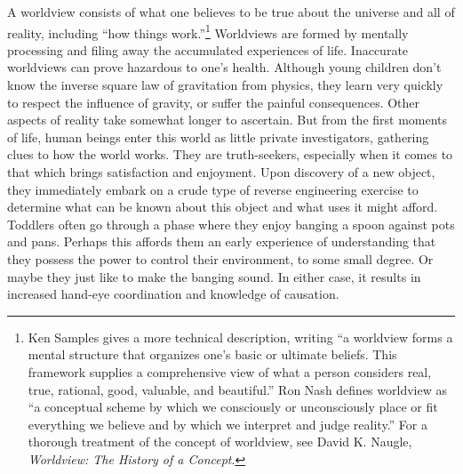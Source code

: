 A worldview consists of what one believes to be true about the universe
and all of reality, including “how things work.”\footnote{Ken Samples gives a more technical description,
writing “a worldview forms a mental structure that organizes one’s
basic or ultimate beliefs. This framework supplies a comprehensive view
of what a person considers real, true, rational, good, valuable, and
beautiful.”\citep{samples2007} 
Ron Nash defines worldview as “a conceptual scheme by
which we consciously or unconsciously place or fit everything we
believe and by which we interpret and judge reality.”\citep[][pg. 24]{nash1988} 
For a thorough treatment of the concept
of worldview, see David K. Naugle, \textit{Worldview: The History of a
Concept}.\citep{naugle2002}
} 
Worldviews are formed by mentally processing and filing away the
accumulated experiences of life. Inaccurate worldviews can prove
hazardous to one’s health. Although young children don’t know the
inverse square law of gravitation from physics, they learn very quickly
to respect the influence of gravity, or suffer the painful
consequences. Other aspects of reality take somewhat longer to
ascertain. But from the first moments of life, human beings enter this
world as little private investigators, gathering clues to how the world
works. They are truth-seekers, especially when it comes to that which
brings satisfaction and enjoyment. Upon discovery of a new object, they
immediately embark on a crude type of reverse engineering exercise to
determine what can be known about this object and what uses it might
afford. Toddlers often go through a phase where they enjoy banging a
spoon against pots and pans. Perhaps this affords them an early
experience of understanding that they possess the power to control
their environment, to some small degree. Or maybe they just like to
make the banging sound. In either case, it results in increased
hand-eye coordination and knowledge of causation.


